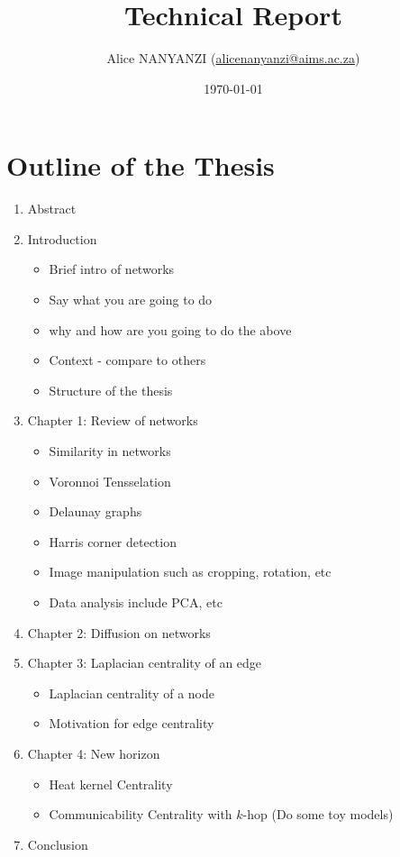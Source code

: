 \documentclass[10pt,a4paper]{article}
\author{Alice NANYANZI (\href{mailto:alicenanyanzi@aims.ac.za}{alicenanyanzi@aims.ac.za})}
\title{Technical Report}
\date{\today}
\theoremstyle{plain}
\theoremstyle{definition}
\begin{document}
	\maketitle
	
	\section*{Outline of the Thesis}
	\begin{enumerate}
		\item Abstract
		\item Introduction
		\begin{itemize}
			\item Brief intro of networks
			\item Say what you are going to do
			\item why and how are you going to do the above 
			\item Context - compare to others
			\item Structure of the thesis
		\end{itemize}
	    \item Chapter 1: Review of networks
	     \begin{itemize}
	     	\item Similarity in networks
	     	\item Voronnoi Tensselation
	     	\item Delaunay graphs
	     	\item Harris corner detection
	     	\item Image manipulation such as cropping, rotation, etc
	     	\item Data analysis include PCA, etc
	     \end{itemize}
        \item Chapter 2: Diffusion on networks
        \item Chapter 3: Laplacian centrality of an edge
        \begin{itemize}
        	\item Laplacian centrality of a node
        	\item Motivation for edge centrality
        \end{itemize}
        \item Chapter 4: New horizon
        \begin{itemize}
        	\item Heat kernel Centrality
        	\item Communicability Centrality with $k$-hop (Do some toy models)
        \end{itemize}
        \item Conclusion
	\end{enumerate}
	
\end{document}
